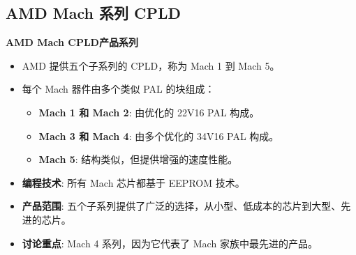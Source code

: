 \subsection{AMD Mach 系列 CPLD}
\begin{frame}[allowframebreaks]{\textbf{AMD Mach CPLD产品系列}}
    \begin{itemize}
    \tightlist
    \item
    AMD 提供五个子系列的 CPLD，称为 Mach 1 到 Mach 5。
    \item
    每个 Mach 器件由多个类似 PAL 的块组成：

    \begin{itemize}
    \tightlist
    \item
        \textbf{Mach 1 和 Mach 2}: 由优化的 22V16 PAL 构成。
    \item
        \textbf{Mach 3 和 Mach 4}: 由多个优化的 34V16 PAL 构成。
    \item
        \textbf{Mach 5}: 结构类似，但提供增强的速度性能。
    \end{itemize}
    \item
    \textbf{编程技术}: 所有 Mach 芯片都基于 EEPROM 技术。
    \item
    \textbf{产品范围}:
    五个子系列提供了广泛的选择，从小型、低成本的芯片到大型、先进的芯片。
    \item
    \textbf{讨论重点}: Mach 4 系列，因为它代表了 Mach
    家族中最先进的产品。
    \end{itemize}
\end{frame}


